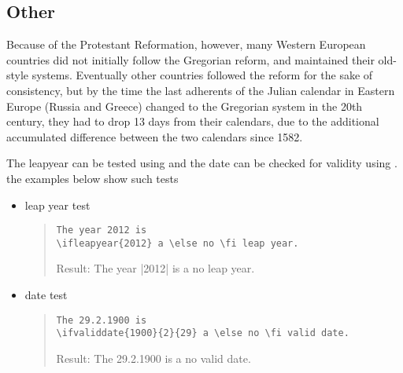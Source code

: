 

\subsection{Other}

Because of the Protestant Reformation, however, many Western European countries did not initially follow the Gregorian reform, and maintained their old-style systems. Eventually other countries followed the reform for the sake of consistency, but by the time the last adherents of the Julian calendar in Eastern Europe (Russia and Greece) changed to the Gregorian system in the 20th century, they had to drop 13 days from their calendars, due to the additional accumulated difference between the two calendars since 1582.

The leapyear  can be tested using
 and the date can be checked for validity using
. the examples below show such tests

\begin{itemize}
\item leap year test
\begin{quote}
\begin{verbatim}
The year 2012 is
 a \else no \fi leap year.
\end{verbatim}
Result: The year |2012| is  a \else no \fi leap year.
\end{quote}
\item date test
\begin{quote}
\begin{verbatim}
The 29.2.1900 is
 a \else no \fi valid date.
\end{verbatim}


Result: The 29.2.1900 is  a \else no \fi valid date.%
\end{quote}
\end{itemize}

